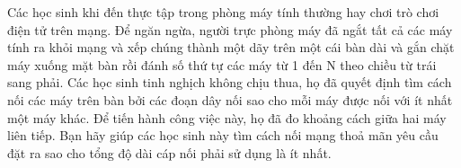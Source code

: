 Các học sinh khi đến thực tập trong phòng máy tính thường hay chơi trò chơi điện tử trên mạng. Để ngăn ngừa, người trực phòng máy đã ngắt tất cả các máy tính ra khỏi mạng và xếp chúng thành một dãy trên một cái bàn dài và gắn chặt máy xuống mặt bàn rồi đánh số thứ tự các máy từ 1 đến N theo chiều từ trái sang phải. Các học sinh tinh nghịch không chịu thua, họ đã quyết định tìm cách nối các máy trên bàn bởi các đoạn dây nối sao cho mỗi máy được nối với ít nhất một máy khác. Để tiến hành công việc này, họ đã đo khoảng cách giữa hai máy liên tiếp. Bạn hãy giúp các học sinh này tìm cách nối mạng thoả mãn yêu cầu đặt ra sao cho tổng độ dài cáp nối phải sử dụng là ít nhất.  

\